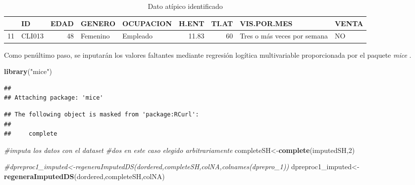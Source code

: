 \documentclass[]{book}
\newenvironment{Shaded}{\begin{snugshade}}{\end{snugshade}}
\newcommand{\KeywordTok}[1]{\textcolor[rgb]{0.13,0.29,0.53}{\textbf{{#1}}}}
\newcommand{\DecValTok}[1]{\textcolor[rgb]{0.00,0.00,0.81}{{#1}}}
\newcommand{\StringTok}[1]{\textcolor[rgb]{0.31,0.60,0.02}{{#1}}}
\newcommand{\CommentTok}[1]{\textcolor[rgb]{0.56,0.35,0.01}{\textit{{#1}}}}
\newcommand{\NormalTok}[1]{{#1}}
\begin{document}
\begin{table}

\caption{\label{tab:dato-atipico}Dato atípico identificado}
\centering
\begin{tabular}[t]{l|l|r|l|l|r|r|l|l}
\hline
  & ID & EDAD & GENERO & OCUPACION & H.ENT & TI.AT & VIS.POR.MES & VENTA\\
\hline
11 & CLI013 & 48 & Femenino & Empleado & 11.83 & 60 & Tres o más veces por semana & NO\\
\hline
\end{tabular}
\end{table}

Como penúltimo paso, se inputarán los valores faltantes mediante
regresión logítica multivariable proporcionada por el paquete
\emph{mice} \citep{mice2011}.

\begin{Shaded}
\begin{Highlighting}[]
\KeywordTok{library}\NormalTok{(}\StringTok{"mice"}\NormalTok{)}
\end{Highlighting}
\end{Shaded}

\begin{verbatim}
## 
## Attaching package: 'mice'
\end{verbatim}

\begin{verbatim}
## The following object is masked from 'package:RCurl':
## 
##     complete
\end{verbatim}

\begin{Shaded}
\end{Shaded}

\begin{Shaded}
\begin{Highlighting}[]
  \CommentTok{#imputa los datos con el dataset #dos en este caso elegido arbitrariamente  }
  \NormalTok{completeSH<-}\KeywordTok{complete}\NormalTok{(imputedSH,}\DecValTok{2}\NormalTok{)}
  
  \CommentTok{#dpreproc1_imputed<-regeneraImputedDS(dordered,completeSH,colNA,colnames(dprepro_1))}
  \NormalTok{dpreproc1_imputed<-}\KeywordTok{regeneraImputedDS}\NormalTok{(dordered,completeSH,colNA)}
\end{Highlighting}
\end{Shaded}
\end{document}
